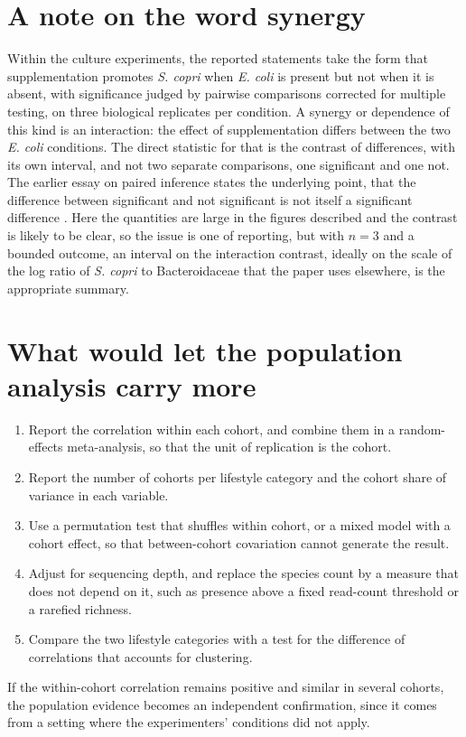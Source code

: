 \documentclass[11pt]{article}
\theoremstyle{definition}
\begin{document}
\section{A note on the word synergy}

Within the culture experiments, the reported statements take the form that supplementation promotes \emph{S. copri} when \emph{E. coli} is present but not when it is absent, with significance judged by pairwise comparisons corrected for multiple testing, on three biological replicates per condition. A synergy or dependence of this kind is an interaction: the effect of supplementation differs between the two \emph{E. coli} conditions. The direct statistic for that is the contrast of differences, with its own interval, and not two separate comparisons, one significant and one not. The earlier essay on paired inference states the underlying point, that the difference between significant and not significant is not itself a significant difference \citep{gelmanstern2006}. Here the quantities are large in the figures described and the contrast is likely to be clear, so the issue is one of reporting, but with $n=3$ and a bounded outcome, an interval on the interaction contrast, ideally on the scale of the log ratio of \emph{S. copri} to Bacteroidaceae that the paper uses elsewhere, is the appropriate summary.

\section{What would let the population analysis carry more}

\begin{enumerate}
\item Report the correlation within each cohort, and combine them in a random-effects meta-analysis, so that the unit of replication is the cohort.
\item Report the number of cohorts per lifestyle category and the cohort share of variance in each variable.
\item Use a permutation test that shuffles within cohort, or a mixed model with a cohort effect, so that between-cohort covariation cannot generate the result.
\item Adjust for sequencing depth, and replace the species count by a measure that does not depend on it, such as presence above a fixed read-count threshold or a rarefied richness.
\item Compare the two lifestyle categories with a test for the difference of correlations that accounts for clustering.
\end{enumerate}
If the within-cohort correlation remains positive and similar in several cohorts, the population evidence becomes an independent confirmation, since it comes from a setting where the experimenters' conditions did not apply.
\end{document}
